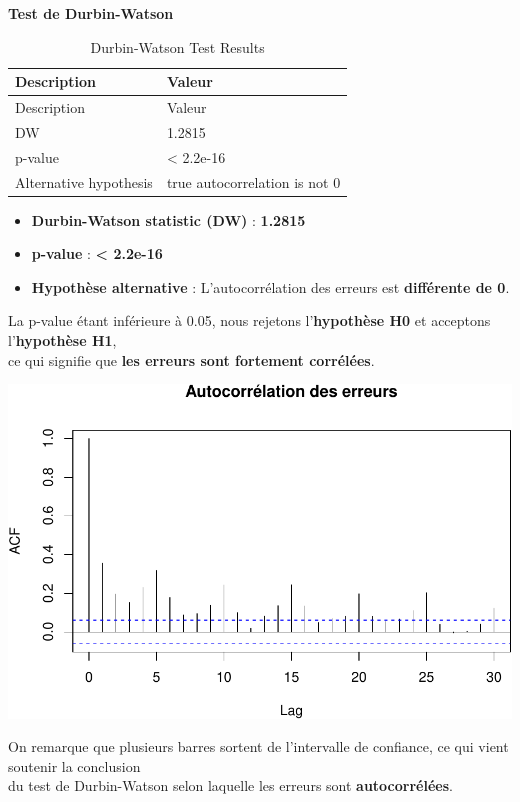 \documentclass[
  12pt,
]{article}
\providecommand{\tightlist}{%
  \setlength{\itemsep}{0pt}\setlength{\parskip}{0pt}}
\begin{document}
\textbf{Test de Durbin-Watson}

\begin{longtable}[]{@{}ll@{}}
\caption{Durbin-Watson Test Results}\tabularnewline
\toprule\noalign{}
Description & Valeur \\
\midrule\noalign{}
\endfirsthead
\toprule\noalign{}
Description & Valeur \\
\midrule\noalign{}
\endhead
\bottomrule\noalign{}
\endlastfoot
DW & 1.2815 \\
p-value & \textless{} 2.2e-16 \\
Alternative hypothesis & true autocorrelation is not 0 \\
\end{longtable}

\begin{itemize}
\tightlist
\item
  \textbf{Durbin-Watson statistic (DW)} : \textbf{1.2815}\\
\item
  \textbf{p-value} : \textbf{\textless{} 2.2e-16}\\
\item
  \textbf{Hypothèse alternative} : L'autocorrélation des erreurs est
  \textbf{différente de 0}.
\end{itemize}

La p-value étant inférieure à 0.05, nous rejetons l'\textbf{hypothèse
H0} et acceptons l'\textbf{hypothèse H1},\\
ce qui signifie que \textbf{les erreurs sont fortement corrélées}.

\includegraphics{rmd_final_files/figure-latex/unnamed-chunk-31-1.pdf}

On remarque que plusieurs barres sortent de l'intervalle de confiance,
ce qui vient soutenir la conclusion\\
du test de Durbin-Watson selon laquelle les erreurs sont
\textbf{autocorrélées}.
\end{document}
